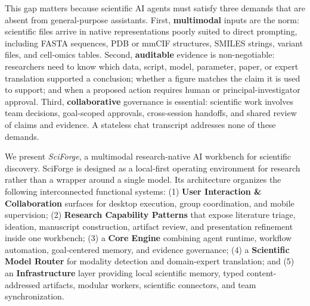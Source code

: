 \documentclass[sn-basic,Numbered,pdflatex]{sn-jnl}
\begin{document}
This gap matters because scientific AI agents must satisfy three demands that are absent from general-purpose assistants. First, \textbf{multimodal} inputs are the norm: scientific files arrive in native representations poorly suited to direct prompting, including FASTA sequences, PDB or mmCIF structures, SMILES strings, variant files, and cell-omics tables. Second, \textbf{auditable} evidence is non-negotiable: researchers need to know which data, script, model, parameter, paper, or expert translation supported a conclusion; whether a figure matches the claim it is used to support; and when a proposed action requires human or principal-investigator approval. Third, \textbf{collaborative} governance is essential: scientific work involves team decisions, goal-scoped approvals, cross-session handoffs, and shared review of claims and evidence. A stateless chat transcript addresses none of these demands.

We present \emph{SciForge}, a multimodal research-native AI workbench for scientific discovery. SciForge is designed as a local-first operating environment for research rather than a wrapper around a single model. Its architecture organizes the following interconnected functional systems: (1) \textbf{User Interaction \& Collaboration} surfaces for desktop execution, group coordination, and mobile supervision; (2) \textbf{Research Capability Patterns} that expose literature triage, ideation, manuscript construction, artifact review, and presentation refinement inside one workbench; (3) a \textbf{Core Engine} combining agent runtime, workflow automation, goal-centered memory, and evidence governance; (4) a \textbf{Scientific Model Router} for modality detection and domain-expert translation; and (5) an \textbf{Infrastructure} layer providing local scientific memory, typed content-addressed artifacts, modular workers, scientific connectors, and team synchronization.
\end{document}
